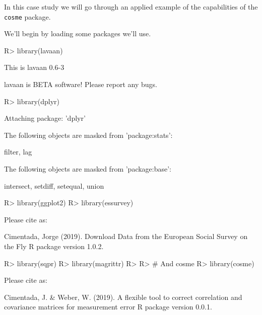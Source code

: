 \documentclass[
]{jss}
\begin{document}
In this case study we will go through an applied example of the
capabilities of the \texttt{cosme} package.

We'll begin by loading some packages we'll use.

\begin{CodeChunk}

\begin{CodeInput}
R> library(lavaan)
\end{CodeInput}

\begin{CodeOutput}
This is lavaan 0.6-3
\end{CodeOutput}

\begin{CodeOutput}
lavaan is BETA software! Please report any bugs.
\end{CodeOutput}

\begin{CodeInput}
R> library(dplyr)
\end{CodeInput}

\begin{CodeOutput}

Attaching package: 'dplyr'
\end{CodeOutput}

\begin{CodeOutput}
The following objects are masked from 'package:stats':

    filter, lag
\end{CodeOutput}

\begin{CodeOutput}
The following objects are masked from 'package:base':

    intersect, setdiff, setequal, union
\end{CodeOutput}

\begin{CodeInput}
R> library(ggplot2)
R> library(essurvey)
\end{CodeInput}

\begin{CodeOutput}

Please cite as: 
\end{CodeOutput}

\begin{CodeOutput}
Cimentada, Jorge (2019). Download Data from the European Social Survey on the Fly R package version 1.0.2.
\end{CodeOutput}

\begin{CodeInput}
R> library(sqpr)
R> library(magrittr)
R> 
R> # And cosme
R> library(cosme)
\end{CodeInput}

\begin{CodeOutput}

Please cite as: 
\end{CodeOutput}

\begin{CodeOutput}
Cimentada, J. & Weber, W. (2019). A flexible tool to correct correlation and covariance matrices for measurement error R package version 0.0.1.
\end{CodeOutput}
\end{CodeChunk}
\end{document}

